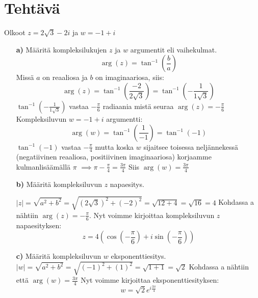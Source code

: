 \documentclass{article}
\newcounter{tehtava}
\begin{document}
\newpage
{}
\section*{Tehtävä \thetehtava}
Olkoot $z = 2\sqrt{3} - 2i$ ja $w = -1 + i$
\begin{itemize}
    \item[\textbf{a)}] Määritä kompleksilukujen $z$ ja $w$ argumentit eli vaihekulmat.
    \[
        \arg(z) = \tan^{-1}\left(\frac{b}{a}\right)
    \]
    Missä $a$ on reaaliosa ja $b$ on imaginaariosa, siis:
    \[
        \arg(z) = \tan^{-1}\left(\frac{-2}{2\sqrt{3}}\right) = \tan^{-1}\left(-\frac{1}{1\sqrt{3}}\right)
    \]
    $\tan^{-1}\left(-\frac{1}{1\sqrt{3}}\right)$ vastaa $-\frac{\pi}{6}$ radiaania mistä seuraa $\arg(z) = -\frac{\pi}{6}$\newline
    \newline
    Kompleksiluvun $w = -1 + i$ argumentti:\newline
    \[
        \arg(w) = \tan^{-1}\left(\frac{1}{-1}\right) = \tan^{-1}\left(-1\right)
    \]
    $\tan^{-1}\left(-1\right)$ vastaa $-\frac{\pi}{4}$ mutta koska $w$ sijaitsee toisessa neljännekessä (negatiivinen reaaliosa, positiivinen imaginaariosa) korjaamme kulman\linebreak lisäämällä $\pi$\newline
    $\implies \pi - \frac{\pi}{4} = \frac{3\pi}{4}$\newline
    Siis $\arg(w) = \frac{3\pi}{4}$
    

    \item[\textbf{b)}] Määritä kompleksiluvun $z$ napaesitys.\newline
    
    $|z| = \sqrt{a^2 + b^2} = \sqrt{(2\sqrt{3})^2 + (-2)^2} = \sqrt{12 + 4} = \sqrt{16} = 4$ \newline
    Kohdassa a nähtiin $\arg(z) = -\frac{\pi}{6}$.\newline
    Nyt voimme kirjoittaa kompleksiluvun $z$ napaesityksen:
    \[
        z = 4 \left( \cos \left( -\frac{\pi}{6} \right) + i \sin \left( -\frac{\pi}{6} \right) \right)
    \]
    \item[\textbf{c)}] Määritä kompleksiluvun $w$ eksponenttiesitys.\newline
    $|w| = \sqrt{a^2 + b^2} = \sqrt{(-1)^2 + (1)^2} = \sqrt{1 + 1} = \sqrt{2}$\newline
    Kohdassa a nähtiin että $\arg(w) = \frac{3\pi}{4}$\newline
    Nyt voimme kirjoittaa eksponenttiesityksen:
    \[
        w = \sqrt{2} e^{i \frac{3\pi}{4}}
    \]
\end{itemize}
\end{document}

